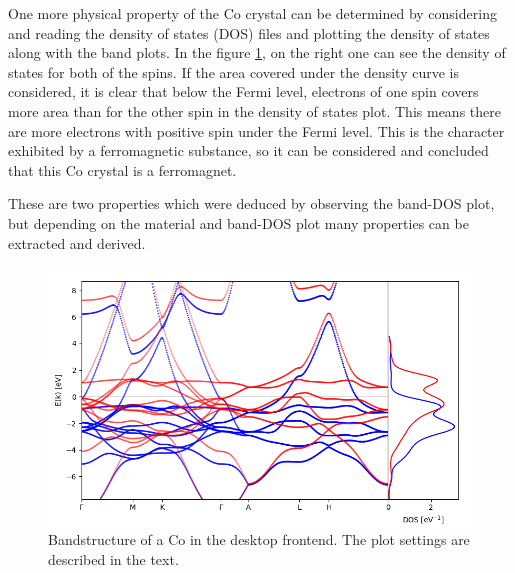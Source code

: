 One more physical property of the $\textrm{Co}$ crystal can be determined by
considering and reading the density of states (DOS) files and plotting the
density of states along with the band plots. In the figure \ref{example4}, on
the right one can see the density of states for both of the spins. If the area
covered under the density curve is considered, it is clear that below the Fermi
level, electrons of one spin covers more area than for the other spin in the
density of states plot. This means there are more electrons with positive spin
under the Fermi level. This is the character exhibited by a ferromagnetic
substance, so it can be considered and concluded that this $\textrm{Co}$ crystal is a ferromagnet.

These are two properties which were deduced by observing the band-DOS plot, but
depending on the material and band-DOS plot many properties can be extracted and
derived.

\begin{figure}[htb!]
    \centering
    \includegraphics[width=0.7\linewidth]{fig/image1.png}
    \caption[Bandstructure of a $\textrm{Co}$ ]{Bandstructure of a $\textrm{Co}$
      in the desktop frontend. The plot settings are described in the text.}
    \label{example4}
\end{figure}




